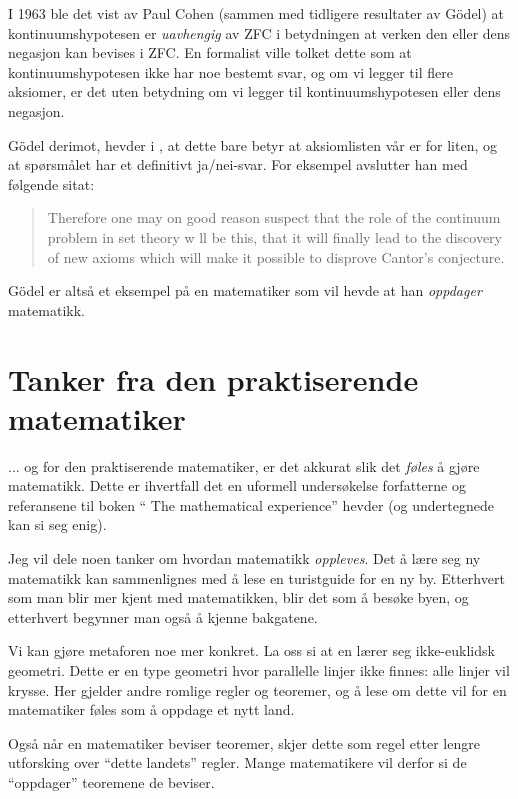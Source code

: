\documentclass[12pt, norsk]{article}
\begin{document}
I 1963 ble det vist av Paul Cohen (sammen med tidligere resultater av Gödel) at kontinuumshypotesen er \emph{uavhengig} av ZFC i betydningen at verken den eller dens negasjon kan bevises i ZFC. En formalist ville tolket dette som at kontinuumshypotesen ikke har noe bestemt svar, og om vi legger til flere aksiomer, er det uten betydning om vi legger til kontinuumshypotesen eller dens negasjon.

Gödel derimot, hevder i \cite{godel_continuum}, at dette bare betyr at aksiomlisten vår er for liten, og at spørsmålet har et definitivt ja/nei-svar. For eksempel avslutter han med følgende sitat:
\begin{quote}
Therefore one may on good reason suspect that the role of the continuum problem in set theory w ll be this, that it will finally lead to the discovery of new axioms which will make it possible to disprove Cantor's conjecture.
\end{quote}

Gödel er altså et eksempel på en matematiker som vil hevde at han \emph{oppdager} matematikk.


\section{Tanker fra den praktiserende matematiker}

... og for den praktiserende matematiker, er det akkurat slik det \emph{føles} å gjøre matematikk. Dette er ihvertfall det en uformell undersøkelse forfatterne og referansene til boken `` The mathematical experience'' \cite{mathematical_experience} hevder (og undertegnede kan si seg enig). 

Jeg vil dele noen tanker om hvordan matematikk \emph{oppleves}. Det å lære seg ny matematikk kan sammenlignes med å lese en turistguide for en ny by. Etterhvert som man blir mer kjent med matematikken, blir det som å besøke byen, og etterhvert begynner man også å kjenne bakgatene.

Vi kan gjøre metaforen noe mer konkret. La oss si at en lærer seg ikke-euklidsk geometri. Dette er en type geometri hvor parallelle linjer ikke finnes: alle linjer vil krysse. Her gjelder andre romlige regler og teoremer, og å lese om dette vil for en matematiker føles som å oppdage et nytt land.

Også når en matematiker beviser teoremer, skjer dette som regel etter lengre utforsking over ``dette landets'' regler. Mange matematikere vil derfor si de ``oppdager'' teoremene de beviser.
\end{document}

